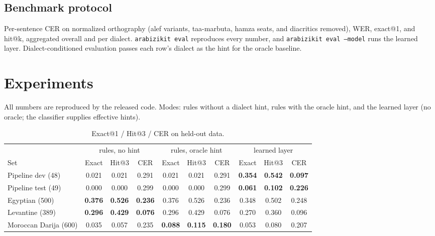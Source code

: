 \documentclass[11pt]{article}
\newcommand{\az}[1]{\texttt{#1}}
\begin{document}
\subsection{Benchmark protocol}
\label{sec:protocol}

Per-sentence CER on normalized orthography (alef variants, taa-marbuta,
hamza seats, and diacritics removed), WER, exact@1, and hit@k,
aggregated overall and per dialect. \az{arabizikit eval} reproduces every
number, and \az{arabizikit eval --model} runs the learned layer.
Dialect-conditioned evaluation passes each row's dialect as the hint for
the oracle baseline.

\section{Experiments}
\label{sec:experiments}

All numbers are reproduced by the released code. Modes: rules without a
dialect hint, rules with the oracle hint, and the learned layer (no
oracle; the classifier supplies effective hints).

\begin{table}[t]
\centering
\small
\caption{Exact@1 / Hit@3 / CER on held-out data.}
\label{tab:main}
\begin{tabular}{lccc ccc ccc}
\toprule
 & \multicolumn{3}{c}{rules, no hint} & \multicolumn{3}{c}{rules, oracle hint} & \multicolumn{3}{c}{learned layer} \\
\cmidrule(lr){2-4}\cmidrule(lr){5-7}\cmidrule(lr){8-10}
Set & Exact & Hit@3 & CER & Exact & Hit@3 & CER & Exact & Hit@3 & CER \\
\midrule
Pipeline dev (48)    & 0.021 & 0.021 & 0.291 & 0.021 & 0.021 & 0.291 & \textbf{0.354} & \textbf{0.542} & \textbf{0.097} \\
Pipeline test (49)   & 0.000 & 0.000 & 0.299 & 0.000 & 0.000 & 0.299 & \textbf{0.061} & \textbf{0.102} & \textbf{0.226} \\
Egyptian (500)       & \textbf{0.376} & \textbf{0.526} & \textbf{0.236} & 0.376 & 0.526 & 0.236 & 0.348 & 0.502 & 0.248 \\
Levantine (389)      & \textbf{0.296} & \textbf{0.429} & \textbf{0.076} & 0.296 & 0.429 & 0.076 & 0.270 & 0.360 & 0.096 \\
Moroccan Darija (600) & 0.035 & 0.057 & 0.235 & \textbf{0.088} & \textbf{0.115} & \textbf{0.180} & 0.053 & 0.080 & 0.207 \\
\bottomrule
\end{tabular}
\end{table}
\end{document}
